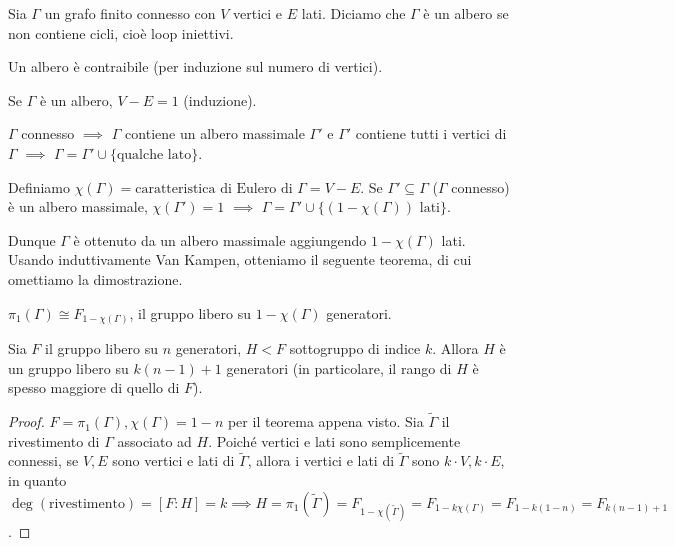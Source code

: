 Sia $\Gamma$ un grafo finito connesso con $V$ vertici e $E$ lati. Diciamo che $\Gamma$ è un albero se non contiene cicli, cioè loop iniettivi.

\begin{ftt}
  \begin{nlist}
    \item Un albero è contraibile (per induzione sul numero di vertici).
    \item Se $\Gamma$ è un albero, $V-E=1$ (induzione).
    \item $\Gamma$ connesso $\implies$ $\Gamma$ contiene un albero massimale $\Gamma'$ e $\Gamma'$ contiene tutti i vertici di $\Gamma$ $\implies$ $\Gamma=\Gamma'\cup\{\text{qualche lato}\}$.
    \item Definiamo $\chi(\Gamma)=\text{caratteristica di Eulero di }\Gamma=V-E$. Se $\Gamma' \subseteq \Gamma$ ($\Gamma$ connesso) è un albero massimale, $\chi(\Gamma')=1$ $\implies$ $\Gamma=\Gamma'\cup\{(1-\chi(\Gamma))\text{ lati}\}$.
    \item Dunque $\Gamma$ è ottenuto da un albero massimale aggiungendo $1-\chi(\Gamma)$ lati. Usando induttivamente Van Kampen, otteniamo il seguente teorema, di cui omettiamo la dimostrazione.
  \end{nlist}
\end{ftt}

\begin{thm}
  $\pi_1(\Gamma) \cong F_{1-\chi(\Gamma)}$, il gruppo libero su $1-\chi(\Gamma)$ generatori.
\end{thm}

\begin{thm}
  Sia $F$ il gruppo libero su $n$ generatori, $H<F$ sottogruppo di indice $k$. Allora $H$ è un gruppo libero su $k(n-1)+1$ generatori (in particolare, il rango di $H$ è spesso maggiore di quello di $F$).
\end{thm}

\begin{proof}
  $F=\pi_1(\Gamma), \chi(\Gamma)=1-n$ per il teorema appena visto. Sia $\widetilde{\Gamma}$ il rivestimento di $\Gamma$ associato ad $H$.
  Poiché vertici e lati sono semplicemente connessi, se $V, E$ sono vertici e lati di $\widetilde{\Gamma}$, allora i vertici e lati di $\widetilde{\Gamma}$ sono $k \cdot V, k \cdot E$, in quanto $\deg{(\text{rivestimento})}=[F:H]=k \implies H=\pi_1(\widetilde{\Gamma})=F_{1-\chi(\widetilde{\Gamma})}=F_{1-k\chi(\Gamma)}=F_{1-k(1-n)}=F_{k(n-1)+1}$.
\end{proof}
